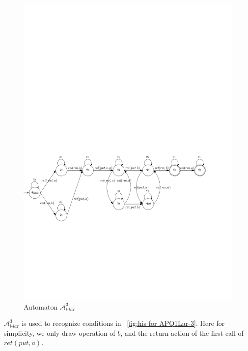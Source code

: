 \begin{figure}[htbp]
  \centering
  \includegraphics[width=1 \textwidth]{figures/PIC_AUTO_PQ1Lar-rppr.pdf}
  \caption{Automaton $\mathcal{A}_{\textit{l-lar}}^3$}
  \label{fig:automata APQ1Lar-3}
\end{figure}


$\mathcal{A}_{\textit{l-lar}}^3$ is used to recognize conditions in \figurename~\ref{fig:his for APQ1Lar-3}. Here for simplicity, we only draw operation of $b$, and the return action of the first call of $\textit{ret}(\textit{put},a)$.


